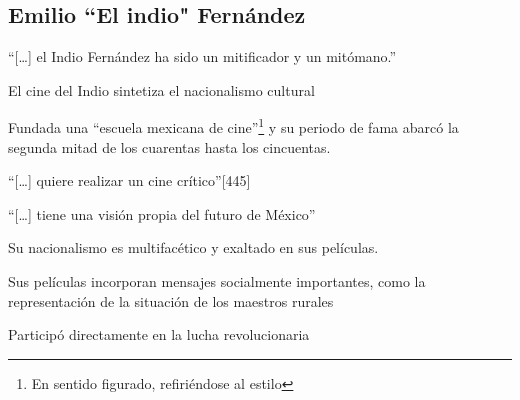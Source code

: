 \subsection{Emilio ``El indio" Fernández}
    \begin{compactitem}
    \item ``[\ldots] el Indio Fernández ha sido un mitificador y un mitómano.''\autocite[445]{cosio_villegas_notas_1976}
    \item El cine del Indio sintetiza el nacionalismo cultural\autocite[444]{cosio_villegas_notas_1976}
    \item Fundada una ``escuela mexicana de cine''\footnote{En sentido figurado, refiriéndose al estilo} y su periodo de fama abarcó la segunda mitad de los cuarentas hasta los cincuentas\autocite[133]{mora_mexican_1978-2}.
    \item ``[\ldots] quiere realizar un cine crítico''[445]\autocite[466]{pablos_escuela_1998-1}
    \item ``[\ldots] tiene una visión propia del futuro de México''\autocite[158]{aguilar_construccion_2014-1}
    \item Su nacionalismo es multifacético y exaltado en sus películas.\autocite[127]{aguilar_construccion_2014-1}
    \item Sus películas incorporan mensajes socialmente importantes, como la representación  de la situación de los maestros rurales\autocite[72]{tierney_myths_2002}
    \item Participó directamente en la lucha revolucionaria  %
    \end{compactitem} 

